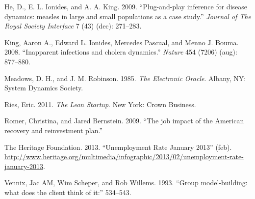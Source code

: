 \documentclass[]{memoir}
\begin{document}
He, D., E. L. Ionides, and A. A. King. 2009. ``Plug-and-play inference
for disease dynamics: measles in large and small populations as a case
study.'' \emph{Journal of The Royal Society Interface} 7 (43) (dec):
271--283.

King, Aaron A., Edward L. Ionides, Mercedes Pascual, and Menno J. Bouma.
2008. ``Inapparent infections and cholera dynamics.'' \emph{Nature} 454
(7206) (aug): 877--880.

Meadows, D. H., and J. M. Robinson. 1985. \emph{The Electronic Oracle}.
Albany, NY: System Dynamics Society.

Ries, Eric. 2011. \emph{The Lean Startup}. New York: Crown Business.

Romer, Christina, and Jared Bernstein. 2009. ``The job impact of the
American recovery and reinvestment plan.''

The Heritage Foundation. 2013. ``Unemployment Rate January 2013'' (feb).
\url{http://www.heritage.org/multimedia/infographic/2013/02/unemployment-rate-january-2013}.

Vennix, Jac AM, Wim Scheper, and Rob Willems. 1993. ``Group
model-building: what does the client think of it:'' 534--543.
\end{document}
